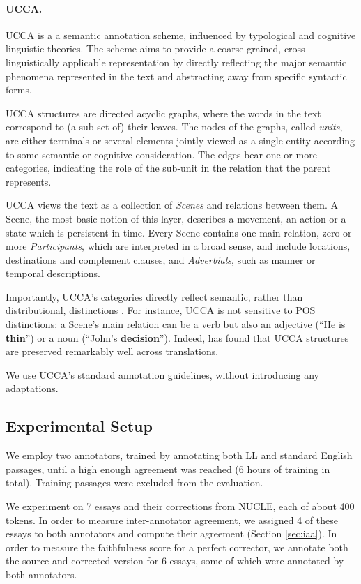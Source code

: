 \documentclass[letter,11pt]{article}
\begin{document}
\paragraph{UCCA.}\label{sec:ucca}
UCCA is a a semantic annotation scheme, influenced
by typological and cognitive linguistic theories.
The scheme aims to provide a coarse-grained, cross-linguistically
applicable representation by directly reflecting the major semantic
phenomena represented in the text and abstracting away from
specific syntactic forms.

UCCA structures are directed acyclic graphs, where the words in the text 
correspond to (a sub-set of) their leaves.
The nodes of the graphs, called {\it units}, are either terminals or several elements jointly
viewed as a single entity according to some semantic or cognitive consideration.
The edges bear one or more categories, indicating the role of 
the sub-unit in the relation that the parent represents.

UCCA views the text as a collection of {\it Scenes} and relations between them.
A Scene, the most basic notion of this layer, describes a movement, 
an action or a state which is persistent in time.
Every Scene contains one main relation, 
zero or more {\it Participants}, 
which are interpreted in a broad sense, 
and include locations, destinations and complement clauses,
and {\it Adverbials}, such as manner or temporal descriptions.

Importantly, UCCA's categories directly reflect semantic, rather than distributional, distinctions .
For instance, UCCA is not sensitive to POS distinctions: a Scene's main relation can be a verb but also an adjective
(``He is {\bf thin}'') or a noun (``John's {\bf decision}'').
Indeed,  has found
that UCCA structures are preserved remarkably well across translations.

We use UCCA's standard annotation guidelines, without introducing any adaptations.

\subsection{Experimental Setup}

We employ two annotators, trained by annotating both LL and standard English
passages, until a high enough agreement was reached (6 hours of training in total).
Training passages were excluded from the evaluation.

We experiment on 7 essays and their corrections from NUCLE, each of about 400 tokens.
In order to measure inter-annotator agreement, we assigned 4 of these essays to both annotators
and compute their agreement (Section \ref{sec:iaa}).
In order to measure the faithfulness score for a perfect corrector, we annotate both
the source and corrected version for 6 essays, some of which were annotated by both annotators.
\end{document}
